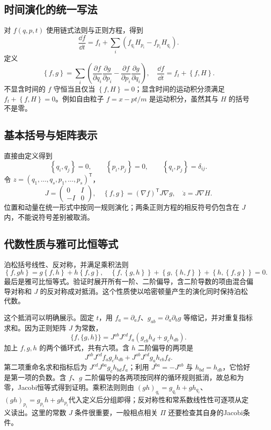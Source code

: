 \documentclass[UTF8,zihao=-4,fontset=fandol,a4paper]{ctexart}
\newcommand{\PB}[2]{\left\{#1,#2\right\}}
\begin{document}
\subsection{时间演化的统一写法}
对 $f(q,p,t)$ 使用链式法则与正则方程，得到
\[
\frac{\dd f}{\dd t}=f_t+\sum_i(f_{q_i}H_{p_i}-f_{p_i}H_{q_i}).
\]
定义
\begin{equation}\PB{f}{g}=\sum_i\left(\frac{\partial f}{\partial q_i}\frac{\partial g}{\partial p_i}-\frac{\partial f}{\partial p_i}\frac{\partial g}{\partial q_i}\right),
\quad\frac{\dd f}{\dd t}=f_t+\PB fH.\label{eq:PB}\end{equation}
不显含时间的 $f$ 守恒当且仅当 $\PB fH=0$；显含时间的运动积分须满足 $f_t+\PB fH=0$。例如自由粒子 $f=x-pt/m$ 是运动积分，虽然其与 $H$ 的括号不是零。
\subsection{基本括号与矩阵表示}
直接由定义得到
\[
\PB{q_i}{q_j}=0,\qquad\PB{p_i}{p_j}=0,\qquad\PB{q_i}{p_j}=\delta_{ij}.
\]
令 $z=(q_1,\ldots,q_s,p_1,\ldots,p_s)^{\mathsf T}$，
\[
J=\begin{pmatrix}0&I\\-I&0\end{pmatrix},\quad
\PB fg=(\nabla f)^{\mathsf T}J\nabla g,\quad\dot z=J\nabla H.
\]
位置和动量在统一形式中按同一规则演化；两条正则方程的相反符号仍包含在 $J$ 内，不能说符号差别被取消。
\subsection{代数性质与雅可比恒等式}
泊松括号线性、反对称，并满足乘积法则
\[
\PB f{gh}=g\PB fh+h\PB fg,
\quad\PB f{\PB gh}+\PB g{\PB hf}+\PB h{\PB fg}=0.
\]
最后是雅可比恒等式。验证时展开所有一阶、二阶偏导，含二阶导数的项由混合偏导对称和 $J$ 的反对称成对抵消。这个性质使以哈密顿量产生的演化同时保持泊松代数。

这个抵消可以明确展示。固定 $t$，用 $f_a=\partial_af$、$g_{ab}=\partial_a\partial_bg$ 等缩记，并对重复指标求和。因为正则矩阵 $J$ 为常数，
\[
\{f,\{g,h\}\}=J^{ab}J^{cd}f_a(g_{cb}h_d+g_c h_{db}).
\]
加上 $f,g,h$ 的两个循环式，共有六项。含 $h$ 二阶偏导的两项是
\[
J^{ab}J^{cd}f_ag_c h_{db}
+J^{ab}J^{cd}g_a h_{cb}f_d.
\]
第二项重命名求和指标后为 $J^{cd}J^{ba}g_c h_{bd}f_a$；利用 $J^{ba}=-J^{ab}$ 与 $h_{bd}=h_{db}$，它恰好是第一项的负数。含 $f$、$g$ 二阶偏导的各两项按同样的循环规则抵消，故总和为零，Jacobi恒等式得到证明。乘积法则则由 $(gh)_{q_i}=g_{q_i}h+gh_{q_i}$、$(gh)_{p_i}=g_{p_i}h+gh_{p_i}$代入定义后分组即得；反对称性和常系数线性性可逐项从定义读出。这里的常数 $J$ 条件很重要，一般相点相关 $\Pi$ 还要检查其自身的Jacobi条件。
\end{document}
